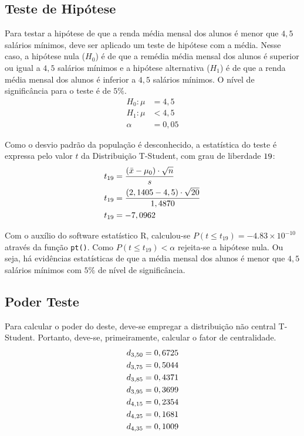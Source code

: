 

\subsection{Teste de Hipótese}

	Para testar a hipótese de que a renda média mensal dos alunos é menor
	que $4,5$ salários mínimos, deve ser aplicado um teste de hipótese com a
	média. Nesse caso, a hipótese nula ($H_0$) é de que a remédia média mensal dos
	alunos é superior ou igual a $4,5$ salários mínimos e a hipótese alternativa
	($H_1$) é de que a renda média mensal dos alunos é inferior a $4,5$ salários
	mínimos. O nível de significância para o teste é de $5\%$.
	\begin{align*}
		H_0: \mu &= 4,5\\
		H_1: \mu &< 4,5   \\
		     \alpha &= 0,05
	\end{align*}

	Como o desvio padrão da população é desconhecido, a estatística do
	teste é expressa pelo valor $t$ da Distribuição T-Student, com grau de
	liberdade $19$:
	\begin{align*}
		t_{19} &= \frac{(\bar{x} - \mu_0)\cdot\sqrt{n}}{s} \\
		t_{19} &= \dfrac{(2,1405 - 4,5) \cdot \sqrt{20}}{1,4870} \\
		t_{19} &= -7,0962
	\end{align*}

	Com o auxílio do software estatístico R, calculou-se $P(t  \leq t_{19})
	= -4.83\times 10^{-10}$ através da função \texttt{pt()}. Como $P(t  \leq
	t_{19}) < \alpha$ rejeita-se a hipótese nula. Ou seja, há evidências
	estatísticas de que a média mensal dos alunos é menor que $4,5$ salários
	mínimos com $5\%$ de nível de significância.

\subsection{Poder Teste}

	Para calcular o poder do deste, deve-se empregar a distribuição não
	central T-Student. Portanto, deve-se, primeiramente, calcular o fator de
	centralidade.
	\begin{align*}
		d_{3,50} &= 0,6725\\
		d_{3,75} &= 0,5044\\
		d_{3,85} &= 0,4371\\
		d_{3,95} &= 0,3699\\
		d_{4,15} &= 0,2354\\
		d_{4,25} &= 0,1681\\
		d_{4,35} &= 0,1009\\
	\end{align*}
	
